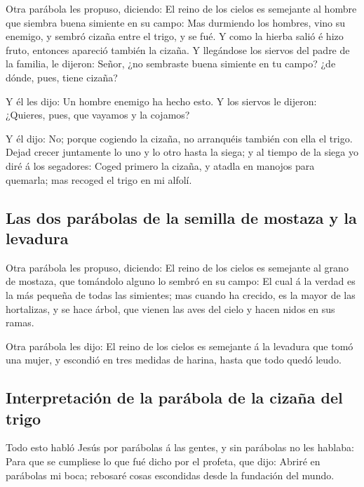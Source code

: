  Otra parábola les propuso, diciendo: El reino de los
cielos es semejante al hombre que siembra buena simiente en su campo:
 Mas durmiendo los hombres, vino su enemigo, y sembró
cizaña entre el trigo, y se fué.  Y como la hierba salió
é hizo fruto, entonces apareció también la cizaña.  Y
llegándose los siervos del padre de la familia, le dijeron: Señor, ¿no
sembraste buena simiente en tu campo? ¿de dónde, pues, tiene cizaña?

 Y él les dijo: Un hombre enemigo ha hecho esto. Y los
siervos le dijeron: ¿Quieres, pues, que vayamos y la cojamos?

 Y él dijo: No; porque cogiendo la cizaña, no arranquéis
también con ella el trigo.  Dejad crecer juntamente lo
uno y lo otro hasta la siega; y al tiempo de la siega yo diré á los
segadores: Coged primero la cizaña, y atadla en manojos para quemarla;
mas recoged el trigo en mi alfolí.

\hypertarget{las-dos-paruxe1bolas-de-la-semilla-de-mostaza-y-la-levadura}{%
\subsection{Las dos parábolas de la semilla de mostaza y la
levadura}\label{las-dos-paruxe1bolas-de-la-semilla-de-mostaza-y-la-levadura}}

 Otra parábola les propuso, diciendo: El reino de los
cielos es semejante al grano de mostaza, que tomándolo alguno lo sembró
en su campo:  El cual á la verdad es la más pequeña de
todas las simientes; mas cuando ha crecido, es la mayor de las
hortalizas, y se hace árbol, que vienen las aves del cielo y hacen nidos
en sus ramas.

 Otra parábola les dijo: El reino de los cielos es
semejante á la levadura que tomó una mujer, y escondió en tres medidas
de harina, hasta que todo quedó leudo.

\hypertarget{interpretaciuxf3n-de-la-paruxe1bola-de-la-cizauxf1a-del-trigo}{%
\subsection{Interpretación de la parábola de la cizaña del
trigo}\label{interpretaciuxf3n-de-la-paruxe1bola-de-la-cizauxf1a-del-trigo}}

 Todo esto habló Jesús por parábolas á las gentes, y sin
parábolas no les hablaba:  Para que se cumpliese lo que
fué dicho por el profeta, que dijo: Abriré en parábolas mi boca;
rebosaré cosas escondidas desde la fundación del mundo.

